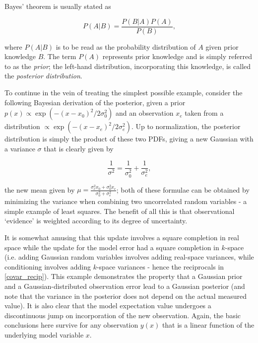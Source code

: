 Bayes' theorem is usually stated as

\begin{equation}
P(A|B) = \frac{P(B|A) P(A)}{P(B)},
\end{equation}

where $P(A|B)$ is to be read as the probability distribution of $A$ given prior knowledge $B$.  
The term $P(A)$ represents prior knowledge and is simply referred to as the {\it prior}; the left-hand distribution, incorporating this knowledge, is called the {\it posterior distribution}.

To continue in the vein of treating the simplest possible example, consider the following Bayesian derivation of the posterior, given a prior $p(x) \propto \exp{\left(-(x-x_0)^2 / 2 \sigma_0^2\right)}$ and an observation $x_e$ taken from a distribution $\propto \exp{\left(-(x-x_e)^2 / 2 \sigma_e^2\right)}$.  
Up to normalization, the posterior distribution is simply the product of these two PDFs, giving a new Gaussian with a variance $\sigma$ that is clearly given by

\begin{equation} \label{covar_recip}
\frac{1}{\sigma^2}  =\frac{1}{\sigma_0^2} + \frac{1}{\sigma_e^2},
\end{equation}

the new mean given by $\mu = \frac{\sigma_e^2 x_0+\sigma_0^2 x_e}{\sigma_0^2+\sigma_e^2}$; both of these formulae can be obtained by minimizing the variance when combining two uncorrelated random variables - a simple example of least squares.  The benefit of all this is that observational `evidence' is weighted according to its degree of uncertainty.

It is somewhat amusing that this update involves a square completion in real space while the update for the model error had a square completion in $k$-space (i.e. adding Gaussian random variables involves adding real-space variances, while conditioning involves adding $k$-space variances - hence the reciprocals in \ref{covar_recip}).  
This example demonstrates the property that a Gaussian prior and a Gaussian-distributed observation error lead to a Gaussian posterior (and note that the variance in the posterior does not depend on the actual measured value).  
It is also clear that the model expectation value undergoes a discontinuous jump on incorporation of the new observation.  Again, the basic conclusions here survive for any observation $y(x)$ that is a linear function of the underlying model variable $x$.

